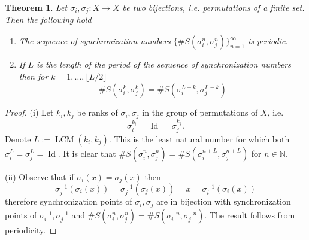 \documentclass[oneside]{amsart}
\def\N{\mathbb{N}}
\def\Id{\operatorname{Id}}
\def\LCM{\operatorname{LCM}}
\newtheorem{thm}{Theorem}
\begin{document}
\begin{thm} \label{thm:synch-numbers-permutations-finite-set}
  Let $\sigma_i, \sigma_j : X \to X$ be two bijections, i.e. permutations of a finite set.
  Then the following hold
  \begin{enumerate}
  \item[\rm (i)] The sequence of synchronization numbers $\{\#S(\sigma_i^n, \sigma_j^n)\}_{n=1}^\infty$ is periodic.
  \item[\rm (ii)] If $L$ is the length of the period of the sequence of synchronization numbers
      then for $k=1,\ldots,\lfloor L/2 \rfloor$
      \begin{equation*} %
        \#S(\sigma_i^k, \sigma_j^k) = \#S(\sigma_i^{L-k}, \sigma_j^{L-k})
      \end{equation*}
  \end{enumerate}
\end{thm}
\begin{proof}
(i) Let $k_i, k_j$ be ranks of $\sigma_i, \sigma_j$ in the group of permutations of $X$, i.e.
  \begin{equation*}
    \sigma_i^{k_i} = \Id = \sigma_j^{k_j}.
  \end{equation*}
  Denote $L := \LCM(k_i,k_j)$. This is the least natural number for which both $\sigma_i^L = \sigma_j^L = \Id$.
  It is clear that $\#S(\sigma_i^n,\sigma_j^n) = \#S(\sigma_i^{n+L},\sigma_j^{n+L})$ for $n \in \N$.

(ii) Observe that if $\sigma_i(x) = \sigma_j(x)$ then
  \begin{equation*}
    \sigma_j^{-1} \left( \sigma_i(x) \right) =  \sigma_j^{-1} \left( \sigma_j(x) \right) = x
    = \sigma_i^{-1} \left( \sigma_i(x) \right)
  \end{equation*}
  therefore synchronization points of $\sigma_i,\sigma_j$ are in bijection with synchronization points
  of $\sigma_i^{-1},\sigma_j^{-1}$ and $\#S(\sigma_i^n,\sigma_j^n) = \#S(\sigma_i^{-n},\sigma_j^{-n})$.
  The result follows from periodicity.
\end{proof}
\end{document}
